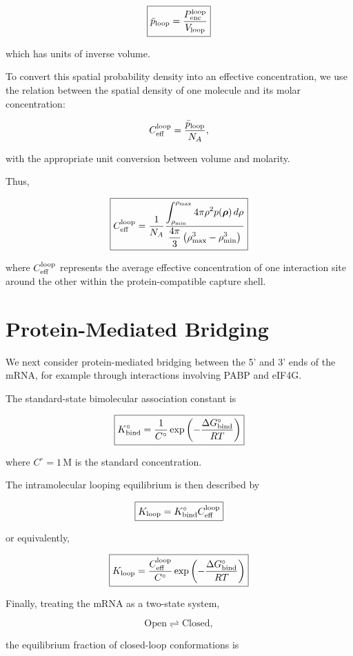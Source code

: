 \documentclass{article}
\begin{document}
\[
\boxed{
\bar p_{\rm loop}
=
\frac{P_{\rm enc}^{\rm loop}}
{V_{\rm loop}}
}
\]

which has units of inverse volume.

To convert this spatial probability density into an effective concentration, we use the relation between the spatial density of one molecule and its molar concentration:

\[
C_{\rm eff}^{\rm loop}
=
\frac{\bar p_{\rm loop}}{N_A},
\]

with the appropriate unit conversion between volume and molarity.

Thus,

\[
\boxed{
C_{\rm eff}^{\rm loop}
=
\frac{1}{N_A}
\frac{
\displaystyle
\int_{\rho_{\min}}^{\rho_{\max}}
4\pi \rho^2p(\boldsymbol{\rho})\,d\rho
}{
\displaystyle
\frac{4\pi}{3}
\left(
\rho_{\max}^3-\rho_{\min}^3
\right)
}
}
\]

where \(C_{\rm eff}^{\rm loop}\) represents the average effective concentration of one interaction site around the other within the protein-compatible capture shell.

\section{Protein-Mediated Bridging}

We next consider protein-mediated bridging between the 5' and 3' ends of the mRNA, for example through interactions involving PABP and eIF4G.

The standard-state bimolecular association constant is

\[
\boxed{
K_{\rm bind}^{\circ}
=
\frac{1}{C^\circ}
\exp\left(
-\frac{\Delta G_{\rm bind}^{\circ}}{RT}
\right)
}
\]

where \(C^\circ=1\,\mathrm{M}\) is the standard concentration.

The intramolecular looping equilibrium is then described by

\[
\boxed{
K_{\rm loop}
=
K_{\rm bind}^{\circ}
C_{\rm eff}^{\rm loop}
}
\]

or equivalently,

\[
\boxed{
K_{\rm loop}
=
\frac{C_{\rm eff}^{\rm loop}}{C^\circ}
\exp\left(
-\frac{\Delta G_{\rm bind}^{\circ}}{RT}
\right)
}
\]

Finally, treating the mRNA as a two-state system,

\[
\mathrm{Open}
\rightleftharpoons
\mathrm{Closed},
\]

the equilibrium fraction of closed-loop conformations is
\end{document}
